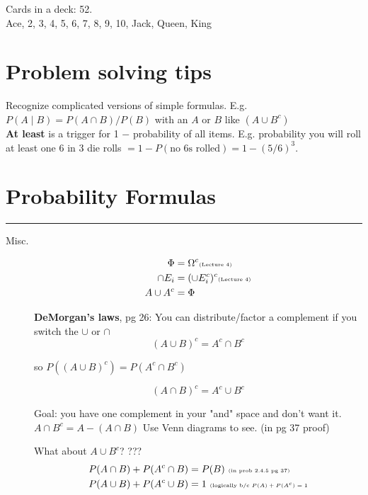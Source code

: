 
Cards in a deck: 52.  \hfill \\
Ace, 2, 3, 4, 5, 6, 7, 8, 9, 10, Jack, Queen, King \hfill \\

\section{Problem solving tips}
Recognize complicated versions of simple formulas.  E.g. $P(A \mid B) = P(A \cap B)/P(B)$ with an $A$ or $B$ like $(A \cup B^c)$ \hfill \\
\textbf{At least} is a trigger for 1 $-$ probability of all items.  E.g. probability you will roll at least one 6 in 3 die rolls $= 1 - P(\mbox{no 6s rolled}) = 1 - (5/6)^3$. 


\section{Probability Formulas}
\smallskip \hrule height 2pt \smallskip

\begin{description}
	\item[Misc.] 
		\begin{align*}
		\Phi &= \Omega^c   \mbox{\tiny{(Lecture 4)}}  \\
		\cap E_i &= (\cup E_i^c)^c       \mbox{\tiny{(Lecture 4)}}  \\
		A \cup A^{c} &= \Phi  
		\end{align*}

		
		\textbf{DeMorgan's laws}, pg 26:  You can distribute/factor a complement if you switch the $\cup$ or $\cap$ \\
		\[  (A \cup B)^c = A^c \cap B^c  \]
		\begin{center} \tiny{so $P((A \cup B)^c) = P(A^c \cap B^c)$}   \end{center}  
		\[   (A \cap B)^c = A^c \cup B^c  \]
		
		Goal: you have one complement in your "and" space and don't want it.  $A \cap B^c = A -(A \cap B)$  Use Venn diagrams to see.   (in pg 37 proof)
		
		What about $A \cup B^c$?  ???
		\hfill \\
		\begin{align*}
		P(A \cap B) + P(A^c \cap B) &= P(B)  \mbox{   \tiny{(in prob 2.4.5 pg 37)}}   \\
		P(A \cup B) + P(A^c \cup B) &= 1  \mbox{   \tiny{(logically b/c $P(A) + P(A^c) = 1$}}  \\
		\end{align*}
		
\end{description}

